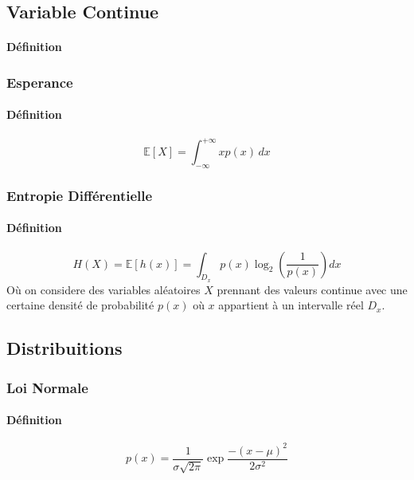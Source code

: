 \documentclass{article}
\begin{document}
\subsection{Variable Continue}
\paragraph{Définition}

\subsubsection{Esperance}
\paragraph{Définition}
\begin{equation}\label{eq:esperance_continue}
    \boxed{
        \mathbb{E}[X] = \int_{-\infty}^{+\infty} x p(x)\,dx
    }
\end{equation}

\subsubsection{Entropie Différentielle}
\paragraph{Définition}
\begin{equation}\label{eq:entropie_differentielle}
    \boxed{
        H(X) = \mathbb{E}[h(x)] = \int_{D_x} p(x) \log_{2} \left( \frac{1}{p(x)} \right) dx
    }
\end{equation}
Où on considere des variables aléatoires $X$ prennant des valeurs continue avec une certaine densité de probabilité $p(x)$ où $x$ appartient à un intervalle réel $D_x$.

\subsection{Distribuitions}
\subsubsection{Loi Normale}
\paragraph{Définition}
\begin{equation}\label{eq:loi_normale}
    \boxed{
        p(x) = \frac{1}{\sigma\sqrt{2\pi}} \exp{\frac{-(x - \mu)^2}{2\sigma^2}}
    }
\end{equation}
\end{document}
